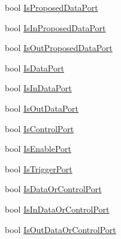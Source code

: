 \begin{DoxyCompactItemize}
bool \hyperlink{classi_c_s___engine_object_aa9ad9dd26f3b900b20a0cad82fcd03fc}{Is\+Proposed\+Data\+Port}
\item 
bool \hyperlink{classi_c_s___engine_object_aa641b55daa513c7ef384e855515d4fb1}{Is\+In\+Proposed\+Data\+Port}
\item 
bool \hyperlink{classi_c_s___engine_object_a426d338afd793d3168567c275f285b69}{Is\+Out\+Proposed\+Data\+Port}
\item 
bool \hyperlink{classi_c_s___engine_object_ab0c905172cac77c12fa1ee1fbc2f63d1}{Is\+Data\+Port}
\item 
bool \hyperlink{classi_c_s___engine_object_a364300be6328d4195c47ed58c67721f3}{Is\+In\+Data\+Port}
\item 
bool \hyperlink{classi_c_s___engine_object_aee4ceccbddea83cf1320c0a91eea4ca4}{Is\+Out\+Data\+Port}
\item 
bool \hyperlink{classi_c_s___engine_object_aaa43ea7ff4afc14d4c731babbd8b74bd}{Is\+Control\+Port}
\item 
bool \hyperlink{classi_c_s___engine_object_a0f018184be41b4fc241efc5ae081b9bf}{Is\+Enable\+Port}
\item 
bool \hyperlink{classi_c_s___engine_object_a3119b32f372ab45ca8f8919f1f739bb2}{Is\+Trigger\+Port}
\item 
bool \hyperlink{classi_c_s___engine_object_a93a2bf3a50fedf1b175d1a680f803772}{Is\+Data\+Or\+Control\+Port}
\item 
bool \hyperlink{classi_c_s___engine_object_a3107e1ca564a3cf6f1046c1bb29ff7e2}{Is\+In\+Data\+Or\+Control\+Port}
\item 
bool \hyperlink{classi_c_s___engine_object_af1e6931562955cf83d6cb2796bd84f26}{Is\+Out\+Data\+Or\+Control\+Port}

\end{DoxyCompactItemize}
